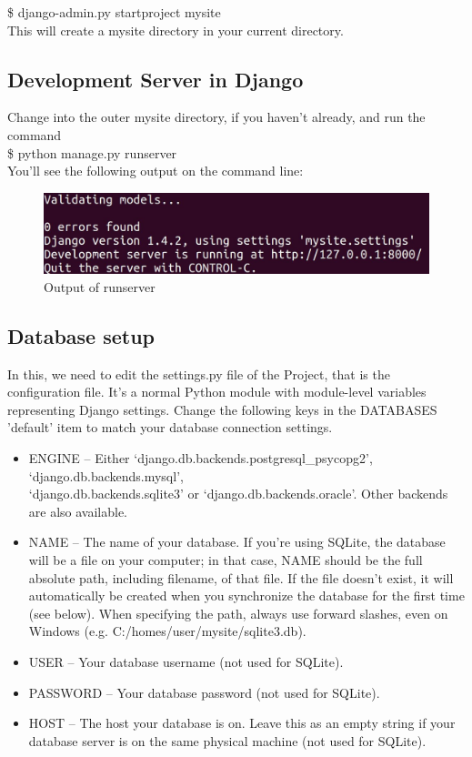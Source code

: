 	\$ django-admin.py startproject mysite \\

\noindent This will create a mysite directory in your current
directory.


\subsection{Development Server in Django}  Change into 
the outer mysite directory, if you haven't already, and run the command\\
	
	\$ python manage.py runserver\\

You'll see the following output on the command line:\\

\begin{figure}[h]
\centering \includegraphics[scale=0.5]{images/out.jpg}
\caption{Output of runserver}
\end{figure}

\subsection{Database setup}
In this, we need to edit the settings.py file of the Project, that is the 
configuration file. It's a normal Python module with module-level 
variables representing Django settings. Change the following keys in 
the DATABASES 'default' item to match your database connection 
settings.
\begin{itemize}
\item ENGINE -- Either `django.db.backends.postgresql\_psycopg2', 
`django.db.backends.mysql',\\ `django.db.backends.sqlite3' or 
`django.db.backends.oracle'. Other backends are also available.
\item NAME -- The name of your database. If you're using SQLite, 
the database will be a file on your computer; in that case, NAME 
should be the full absolute path, including filename, of that file. If 
the file doesn't exist, it will automatically be created when you 
synchronize the database for the first time (see below). When specifying 
the path, always use forward slashes, even on Windows 
(e.g. C:/homes/user/mysite/sqlite3.db). 
\item USER -- Your database username (not used for SQLite).
\item PASSWORD -- Your database password (not used for SQLite).
\item HOST -- The host your database is on. Leave this as an empty 
string if your database server is on the same physical machine (not 
used for SQLite).
\end{itemize}

